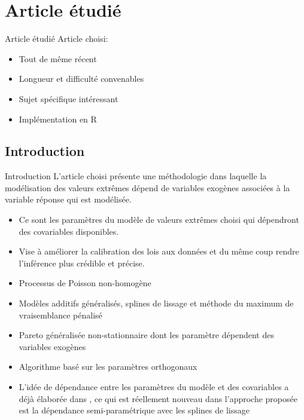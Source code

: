 \documentclass[aspectratio=169, 12pt, french]{beamer}
\begin{document}
\section{Article étudié}

\begin{frame}{Article étudié}
Article choisi: \cite{chavez2016extreme}
\begin{itemize}
\item Tout de même récent
\item Longueur et difficulté convenables
\item Sujet spécifique intéressant
\item Implémentation en \textsf{R}
\end{itemize}
\end{frame}

\subsection{Introduction}
\begin{frame}{Introduction}
L'article choisi présente une méthodologie dans laquelle la modélisation des valeurs extrêmes dépend de variables exogènes associées à la variable réponse qui est modélisée.
\begin{itemize}
\item Ce sont les paramètres du modèle de valeurs extrêmes choisi qui dépendront des covariables disponibles.
\item Vise à améliorer la calibration des lois aux données et du même coup rendre l'inférence plus crédible et précise.
\end{itemize}
\end{frame}

\begin{frame}
\begin{itemize}
\item Processus de Poisson non-homogène 
\item Modèles additifs généralisés, splines de lissage et méthode du maximum de vraisemblance pénalisé
\item Pareto généralisée non-stationnaire dont les paramètre dépendent des variables exogènes
\item Algorithme basé sur les paramètres orthogonaux
\item  L'idée de dépendance entre les paramètres du modèle et des covariables a déjà élaborée dans \cite{coles2001introduction}, ce qui est réellement nouveau dans l'approche proposée est la dépendance semi-paramétrique avec les splines de lissage
\end{itemize}
\end{frame}
\end{document}
